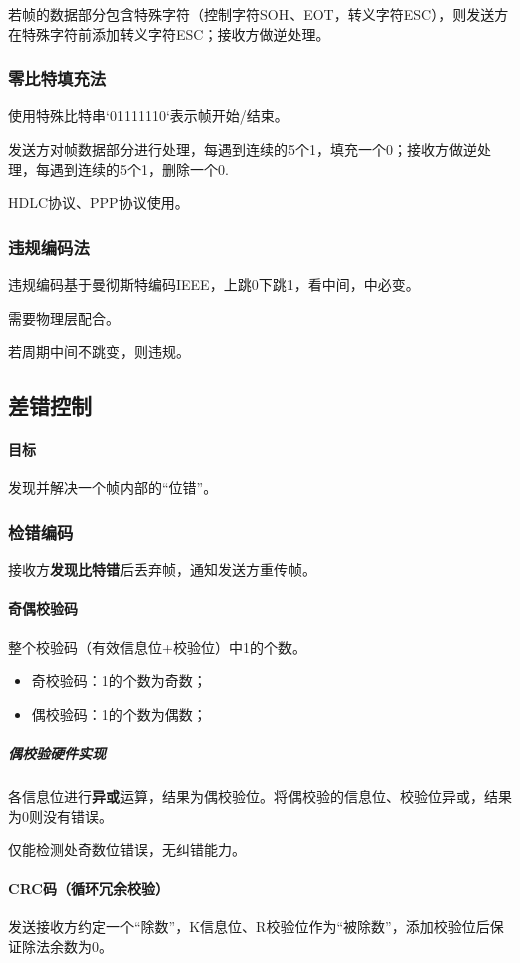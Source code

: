 若帧的数据部分包含特殊字符（控制字符SOH、EOT，转义字符ESC），则发送方在特殊字符前添加转义字符ESC；接收方做逆处理。


\subsubsection{零比特填充法}
使用特殊比特串`01111110`表示帧开始/结束。

发送方对帧数据部分进行处理，每遇到连续的5个1，填充一个0；接收方做逆处理，每遇到连续的5个1，删除一个0.

HDLC协议、PPP协议使用。


\subsubsection{违规编码法}
违规编码基于曼彻斯特编码IEEE，上跳0下跳1，看中间，中必变。

需要物理层配合。

若周期中间不跳变，则违规。


\subsection{差错控制}

\paragraph{目标}
发现并解决一个帧内部的“位错”。


\subsubsection{检错编码}
接收方\textbf{发现比特错}后丢弃帧，通知发送方重传帧。

\paragraph{奇偶校验码}
整个校验码（有效信息位+校验位）中1的个数。
\begin{itemize}
    \item 奇校验码：1的个数为奇数；
    \item 偶校验码：1的个数为偶数；
\end{itemize}
\subparagraph{偶校验硬件实现}
各信息位进行\textbf{异或}运算，结果为偶校验位。将偶校验的信息位、校验位异或，结果为0则没有错误。

仅能检测处奇数位错误，无纠错能力。


\paragraph{CRC码（循环冗余校验）}
发送接收方约定一个“除数”，K信息位、R校验位作为“被除数”，添加校验位后保证除法余数为0。

